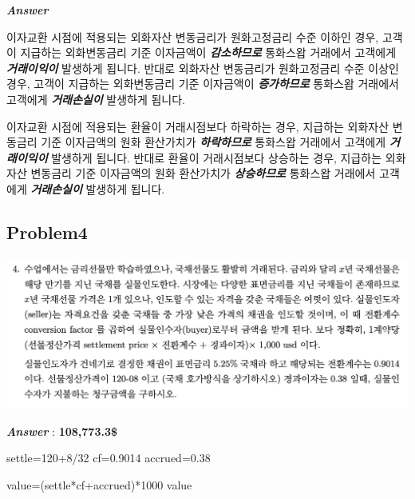 \documentclass[
  a4paper,
  DIV=11,
  numbers=noendperiod]{scrreprt}
\newenvironment{Shaded}{\begin{snugshade}}{\end{snugshade}}
\newcommand{\DecValTok}[1]{\textcolor[rgb]{0.68,0.00,0.00}{#1}}
\newcommand{\FloatTok}[1]{\textcolor[rgb]{0.68,0.00,0.00}{#1}}
\newcommand{\NormalTok}[1]{\textcolor[rgb]{0.00,0.23,0.31}{#1}}
\newcommand{\OtherTok}[1]{\textcolor[rgb]{0.00,0.23,0.31}{#1}}
\newcommand{\SpecialCharTok}[1]{\textcolor[rgb]{0.37,0.37,0.37}{#1}}
\begin{document}
\textbf{\emph{Answer}}

이자교환 시점에 적용되는 외화자산 변동금리가 원화고정금리 수준 이하인
경우, 고객이 지급하는 외화변동금리 기준 이자금액이
\textbf{\emph{감소하므로}} 통화스왑 거래에서 고객에게
\textbf{\emph{거래이익이}} 발생하게 됩니다. 반대로 외화자산 변동금리가
원화고정금리 수준 이상인 경우, 고객이 지급하는 외화변동금리 기준
이자금액이 \textbf{\emph{증가하므로}} 통화스왑 거래에서 고객에게
\textbf{\emph{거래손실이}} 발생하게 됩니다.

이자교환 시점에 적용되는 환율이 거래시점보다 하락하는 경우, 지급하는
외화자산 변동금리 기준 이자금액의 원화 환산가치가
\textbf{\emph{하락하므로}} 통화스왑 거래에서 고객에게
\textbf{\emph{거래이익이}} 발생하게 됩니다. 반대로 환율이 거래시점보다
상승하는 경우, 지급하는 외화자산 변동금리 기준 이자금액의 원화
환산가치가 \textbf{\emph{상승하므로}} 통화스왑 거래에서 고객에게
\textbf{\emph{거래손실이}} 발생하게 됩니다.

\subsection*{Problem4}\label{problem4}

\includegraphics{images/이자율hw1_5.png}

\textbf{\emph{Answer}} : \textbf{108,773.3\$}

\begin{Shaded}
\begin{Highlighting}[]
\NormalTok{settle}\OtherTok{=}\DecValTok{120}\SpecialCharTok{+}\DecValTok{8}\SpecialCharTok{/}\DecValTok{32}
\NormalTok{cf}\OtherTok{=}\FloatTok{0.9014}
\NormalTok{accrued}\OtherTok{=}\FloatTok{0.38}

\NormalTok{value}\OtherTok{=}\NormalTok{(settle}\SpecialCharTok{*}\NormalTok{cf}\SpecialCharTok{+}\NormalTok{accrued)}\SpecialCharTok{*}\DecValTok{1000}
\NormalTok{value}
\end{Highlighting}
\end{Shaded}
\end{document}
